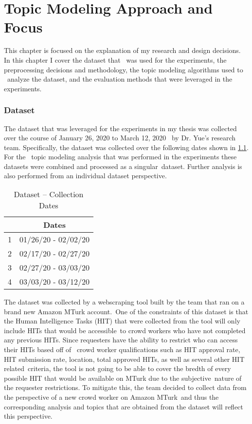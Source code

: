 \documentclass[letterpaper,12pt]{article}
\begin{document}
\chapter{Topic Modeling Approach and Focus}
This chapter is focused on the explanation of my research and design decisions. In this chapter I cover the dataset that \
was used for the experiments, the preprocessing decisions and methodology, the topic modeling algorithms used to \
analyze the dataset, and the evaluation methods that were leveraged in the experiments.

\subsection{Dataset}
The dataset that was leveraged for the experiments in my thesis was collected over the course of January 26, 2020 to March 12, 2020 \
by Dr. Yue's research team. Specifically, the dataset was collected over the following dates shown in \ref{tab:data_dates}. For the \
topic modeling analysis that was performed in the experiments these datasets were combined and processed as a singular\
dataset. Further analysis is also performed from an individual dataset perspective.
\begin{table}
	\caption{\label{tab:data_dates} Dataset -- Collection Dates}
	\begin{center}
		\begin{tabular}{|c|c|}
			\hline
			& Dates \\
			\hline
			1 & 01/26/20 - 02/02/20 \\
			\hline
			2 & 02/17/20 - 02/27/20 \\
			\hline
			3 & 02/27/20 - 03/03/20 \\
			\hline
			4 & 03/03/20 - 03/12/20 \\
			\hline
		\end{tabular}
	\end{center}
\end{table}
The dataset was collected by a webscraping tool built by the team that ran on a brand new Amazon MTurk account.\
One of the constraints of this dataset is that the Human Intelligence Tasks (HIT) that were collected from the tool will only include HITs that would be accessible\
to crowd workers who have not completed any previous HITs. Since requesters have the ability to restrict who can access their HITs based off of \
crowd worker qualifications such as HIT approval rate, HIT submission rate, location, total approved HITs, as well as several other HIT related\
criteria, the tool is not going to be able to cover the bredth of every possible HIT that would be available on MTurk due to the subjective\
nature of the requester restrictions. To mitigate this, the team decided to collect data from the perspective of a new crowd worker on Amazon MTurk\
and thus the corresponding analysis and topics that are obtained from the dataset will reflect this perspective.
\end{document}
